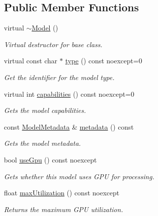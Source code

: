 \subsection*{Public Member Functions}
\begin{DoxyCompactItemize}
\item 
virtual \hyperlink{group___classification_module_ga744d3e71e7c92fb7a8fa52e27095575f}{$\sim$\+Model} ()
\begin{DoxyCompactList}\small\item\em Virtual destructor for base class. \end{DoxyCompactList}\item 
virtual const char $\ast$ \hyperlink{group___classification_module_gaf5f12d2050c32035c1b9a038ec61d618}{type} () const noexcept=0
\begin{DoxyCompactList}\small\item\em Get the identifier for the model type. \end{DoxyCompactList}\item 
virtual int \hyperlink{group___classification_module_ga1a7ca79fbb134c78c7e88df94cf8d374}{capabilities} () const noexcept=0
\begin{DoxyCompactList}\small\item\em Gets the model capabilities. \end{DoxyCompactList}\item 
const \hyperlink{classdg_1_1deepcore_1_1classification_1_1_model_metadata}{Model\+Metadata} \& \hyperlink{group___classification_module_ga33bdb8fac324a49d0e70175a1440cdd1}{metadata} () const 
\begin{DoxyCompactList}\small\item\em Gets the model metadata. \end{DoxyCompactList}\item 
bool \hyperlink{group___classification_module_gaea38e3353458ab22d099d54411d6f868}{use\+Gpu} () const noexcept
\begin{DoxyCompactList}\small\item\em Gets whether this model uses G\+PU for processing. \end{DoxyCompactList}\item 
float \hyperlink{group___classification_module_ga08d73772f04eb0553e4d787c69b34aa2}{max\+Utilization} () const noexcept
\begin{DoxyCompactList}\small\item\em Returns the maximum G\+PU utilization. \end{DoxyCompactList}\item 

\end{DoxyCompactItemize}
